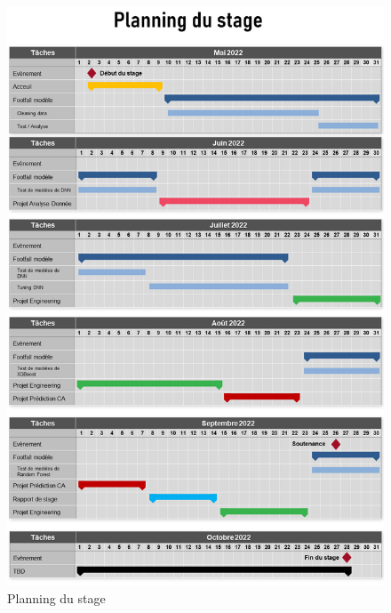 \documentclass{themeensg}
\begin{document}
\newevenpage
\printbibliography[title={Bibliographie}]
\nocite{*}

\newevenpage
\listoffigures

\newevenpage
\listoftables

\begin{appendices} 
\label{beginappendices}
\label{planning_gannt}

\begin{figure}[H]
  \centering
  \includegraphics[width=13cm]{images/graphs/gannt.png}
  \caption{Planning du stage}
\end{figure}


\end{appendices}
\end{document}

